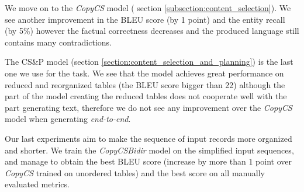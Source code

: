 We move on to the \emph{CopyCS} model ( section \ref{subsection:content_selection}). We see another improvement in the BLEU score (by 1 point) and the entity recall (by 5\%) however the factual correctness decreases and the produced language still contains many contradictions.

The CS\&P model (section \ref{section:content_selection_and_planning}) is the last one we use for the task. We see that the model achieves great performance on reduced and reorganized tables (the BLEU score bigger than 22) although the part of the model creating the reduced tables does not cooperate well with the part generating text, therefore we do not see any improvement over the \emph{CopyCS} model when generating \emph{end-to-end}.

Our last experiments aim to make the sequence of input records more organized and shorter. We train the \emph{CopyCSBidir} model on the simplified input sequences, and manage to obtain the best BLEU score (increase by more than $1$ point over \emph{CopyCS} trained on unordered tables) and the best score on all manually evaluated metrics.

